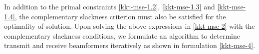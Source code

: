 In addition to the primal constraints \eqref{kkt-mse-1.2}, \eqref{kkt-mse-1.3} and \eqref{kkt-mse-1.4}, the complementary slackness criterion must also be satisfied for the optimality of solution. Upon solving the above expressions in \eqref{kkt-mse-2} with the complementary slackness conditions, we formulate an algorithm to determine transmit and receive beamformers iteratively as shown in formulation \eqref{kkt-mse-4}.
